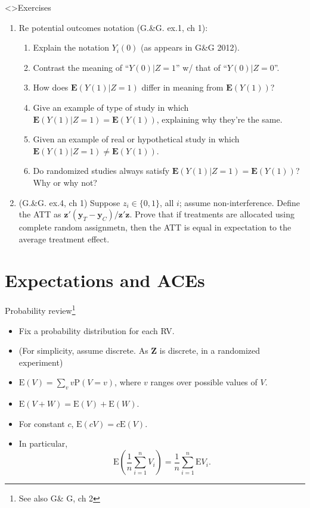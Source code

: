 \begin{frame}<\nottheirhandout>{Exercises}
  \begin{enumerate}
  \item Re potential outcomes notation {}(G.\&G. ex.1, ch 1):
    \begin{enumerate}
    \item Explain the notation $Y_{i}(0)$ (as appears in G\&G 2012).
    \item Contrast the meaning of ``$Y(0) | Z=1$'' w/ that of ``$Y(0) | Z=0$''.
    \item How does $\mathbf{E}(Y(1) | Z=1)$ differ in meaning from $\mathbf{E}(Y(1))$?
    \item Give an example of type of study in which $\mathbf{E}(Y(1) | Z=1) = \mathbf{E}(Y(1))$, explaining why they're the same.
    \item Given an example of real or hypothetical study in which $\mathbf{E}(Y(1) | Z=1) \neq \mathbf{E}(Y(1))$.
    \item Do randomized studies always satisfy $\mathbf{E}(Y(1) | Z=1) = \mathbf{E}(Y(1))$?  Why or why not?
    \end{enumerate}
\item (G.\&G. ex.4, ch 1) Suppose $z_{i} \in \{0,1\}$, all $i$; assume non-interference. Define the ATT as $\mathbf{z}'(\mathbf{y}_{T}-\mathbf{y}_{C})/\mathbf{z}'\mathbf{z}$.  Prove that if treatments are allocated using complete random assignmetn, then the ATT is equal in expectation to the average treatment effect.
  \end{enumerate}

\end{frame}

\section{Expectations and ACEs}

\begin{frame}{Probability review\footnote{See also G\& G, ch 2}}

  \begin{itemize}
  \item Fix a probability distribution for each RV.
  \item (For simplicity, assume discrete.  As $\mathbf{Z}$ is discrete, in a randomized experiment)
  \item  $\mathrm{E}(V) = \sum_v v\mathrm{P}(V=v) $, where $v$ ranges over possible values of $V$.
  \item $\mathrm{E}(V + W) = \mathrm{E}(V) + \mathrm{E}(W)$.
  \item For constant $c$, $\mathrm{E}(cV) = c\mathrm{E}(V)$.
  \item In particular, 
$$\mathrm{E}\left(\frac{1}{n} \sum_{i=1}^n V_i\right) = \frac{1}{n} \sum_{i=1}^n \mathrm{E} V_i.$$
  \end{itemize}


\end{frame}


